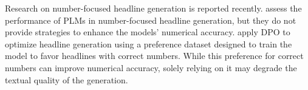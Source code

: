 Research on number-focused headline generation is reported recently. 
\citet{huang-etal-2024-numhg} assess the performance of PLMs in number-focused headline generation, but they do not provide strategies to enhance the models' numerical accuracy. \citet{rajpoot_team_2024} apply DPO to optimize headline generation using a preference dataset designed to train the model to favor headlines with correct numbers. While this preference for correct numbers can improve numerical accuracy, solely relying on it may degrade the textual quality of the generation. 


